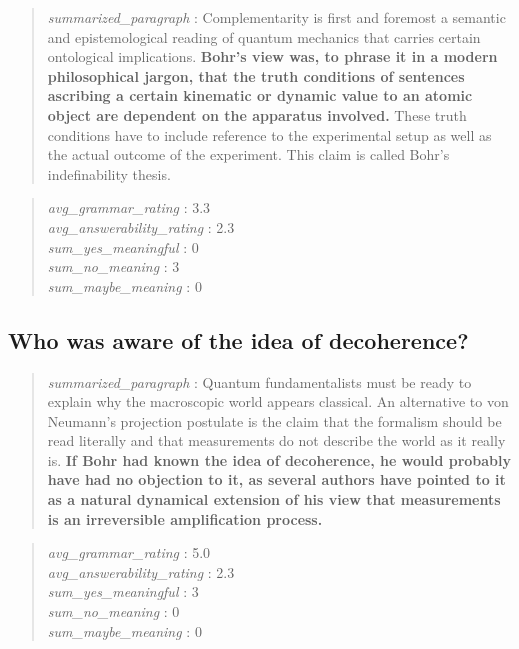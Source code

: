 \begin{quote}
\emph{summarized\_paragraph} : Complementarity is first and foremost a
semantic and epistemological reading of quantum mechanics that carries
certain ontological implications. \textbf{Bohr's view was, to phrase it
in a modern philosophical jargon, that the truth conditions of sentences
ascribing a certain kinematic or dynamic value to an atomic object are
dependent on the apparatus involved.} These truth conditions have to
include reference to the experimental setup as well as the actual
outcome of the experiment. This claim is called Bohr's indefinability
thesis.
\end{quote}

\begin{quote}
\emph{avg\_grammar\_rating} : 3.3\\
\emph{avg\_answerability\_rating} : 2.3\\
\emph{sum\_yes\_meaningful} : 0\\
\emph{sum\_no\_meaning} : 3\\
\emph{sum\_maybe\_meaning} : 0
\end{quote}

\hypertarget{who-was-aware-of-the-idea-of-decoherence}{%
\subsection{Who was aware of the idea of
decoherence?}\label{who-was-aware-of-the-idea-of-decoherence}}

\begin{quote}
\emph{summarized\_paragraph} : Quantum fundamentalists must be ready to
explain why the macroscopic world appears classical. An alternative to
von Neumann's projection postulate is the claim that the formalism
should be read literally and that measurements do not describe the world
as it really is. \textbf{If Bohr had known the idea of decoherence, he
would probably have had no objection to it, as several authors have
pointed to it as a natural dynamical extension of his view that
measurements is an irreversible amplification process.}
\end{quote}

\begin{quote}
\emph{avg\_grammar\_rating} : 5.0\\
\emph{avg\_answerability\_rating} : 2.3\\
\emph{sum\_yes\_meaningful} : 3\\
\emph{sum\_no\_meaning} : 0\\
\emph{sum\_maybe\_meaning} : 0
\end{quote}

